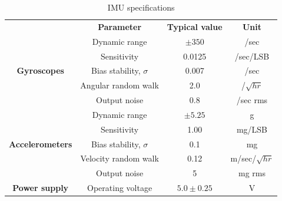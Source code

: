 \begin{table}[htb!]\caption{IMU specifications}\label{tab:IMU_specifications}
	\centering
	\begin{tabular}{c|c|c|c|}
		\cline{2-4}
		& \textbf{Parameter} & \textbf{Typical value} & \textbf{Unit}\\ \cline{1-4}
		\multicolumn{1}{|c|}{\multirow{5}{*}{\textbf{Gyroscopes}}} & Dynamic range & $\pm 350$ & \degree/sec\\ 
		\multicolumn{1}{|c|}{} & Sensitivity & 0.0125 & \degree/sec/LSB\\ 
		\multicolumn{1}{|c|}{} & Bias stability, $\sigma$ & 0.007 & \degree/sec\\ 
		\multicolumn{1}{|c|}{} & Angular random walk & 2.0 & \degree/$\sqrt{hr}$\\ 
		\multicolumn{1}{|c|}{} & Output noise & 0.8 & \degree/sec rms\\ \cline{1-4}
		
		\multicolumn{1}{|c|}{\multirow{5}{*}{\textbf{Accelerometers}}} & Dynamic range & $\pm 5.25$ & g\\ 
		\multicolumn{1}{|c|}{} & Sensitivity & 1.00 & mg/LSB\\ 
		\multicolumn{1}{|c|}{} & Bias stability, $\sigma$ & 0.1 & mg\\ 
		\multicolumn{1}{|c|}{} & Velocity random walk & 0.12 & m/sec/$\sqrt{hr}$\\ 
		\multicolumn{1}{|c|}{} & Output noise & 5 & mg rms\\ \cline{1-4}
		
		\multicolumn{1}{|c|}{\multirow{1}{*}{\textbf{Power supply}}} & Operating voltage& $5.0 \pm 0.25$ & V\\ \cline{1-4}
	\end{tabular}
\end{table}
